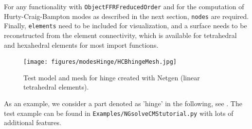 For any functionality with \texttt{ObjectFFRFreducedOrder} and for the computation of Hurty-Craig-Bampton modes as described in the next section, \texttt{nodes}
are required.
Finally, \texttt{elements} need to be included for visualization, and a surface needs to be reconstructed from the element connectivity, which is available for tetrahedral and hexahedral elements for most import functions.

\begin{figure}[tbph]
  \begin{center}
  \texttt{[image: figures/modesHinge/HCBhingeMesh.jpg]}
  \end{center}
  \caption{Test model and mesh for hinge created with Netgen (linear tetrahedral elements).}
  \label{fig_hingePartMesh}
\end{figure}
As an example, we consider a part denoted as 'hinge' in the following, see . The test example can be found in \texttt{Examples/NGsolveCMStutorial.py} with lots of additional features.

